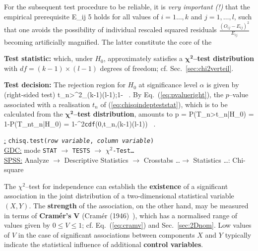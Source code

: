 \medskip
\noindent
For the subsequent test procedure to be reliable, it is
\textit{very important (!)} that the empirical prere\-quisite
%
\be
E_{ij} \stackrel{!}{\geq} 5
\ee
%  
holds for all values of $i=1\ldots,k$ and $j=1,\ldots,l$,
such that one avoids the possibility of individual rescaled 
squared residuals $\displaystyle 
\frac{(O_{ij}-E_{ij})^{2}}{E_{ij}}$ becoming artificially 
magnified. The latter constitute the core of the

\medskip
\noindent
\textbf{Test statistic:}
%
\be
{}
\ee
%
which, under $H_{0}$, approximately satisfies a 
$\boldsymbol{\chi^{2}}$\textbf{--test distribution} with $df=(k-1)
\times (l-1)$ degrees of freedom; cf. Sec.~\ref{sec:chi2verteil}.

\medskip
\noindent
\textbf{Test decision:} The rejection region for $H_{0}$ at 
significance level $\alpha$ is given by (right-sided test)
%
\be
t_{n}>\chi^{2}_{(k-1)\times(l-1);1-\alpha} \ .
\ee
%
By Eq.~(\ref{eq:pvalueright}), the $p$--value associated with a 
realisation $t_{n}$ of (\ref{eq:chisqindepteststat}), which is to
be calculated from the $\boldsymbol{\chi^{2}}$\textbf{--test
distribution}, amounts to
%
\be
p = P(T_{n}>t_{n}|H_{0}) = 1-P(T_{n}\leq t_{n}|H_{0})
= 1-\chi^{2}\texttt{cdf}\left(0,t_{n},(k-1)\times(l-1)\right) \ .
\ee
%

\medskip
\noindent
\underline{\R:} \texttt{chisq.test(\textit{row variable},
\textit{column variable})} \\
\underline{GDC:} mode \texttt{STAT} $\rightarrow$ \texttt{TESTS}
$\rightarrow$ \texttt{$\chi^{2}$-Test\ldots} \\
\underline{SPSS:} Analyze $\rightarrow$ Descriptive Statistics
$\rightarrow$ Crosstabs \ldots $\rightarrow$ Statistics \ldots:
Chi-square

\medskip
\noindent
The $\chi^{2}$--test for independence can establish the 
\textbf{existence} of a significant association in the joint
distribution of a two-dimensional statistical variable~$(X,Y)$. 
The \textbf{strength} of the association, on the other hand, 
may be measured in terms of \textbf{Cram\'{e}r's} $\boldsymbol{V}$
(Cram\'{e}r (1946)~), which has a normalised range of 
values given by $0 \leq V \leq 1$; cf. Eq.~(\ref{eq:cramv}) and 
Sec.~\ref{sec:2Dnom}. Low values of $V$ in the case of significant 
associations between components $X$ and $Y$ typically indicate the 
statistical influence of additional \textbf{control variables}.

